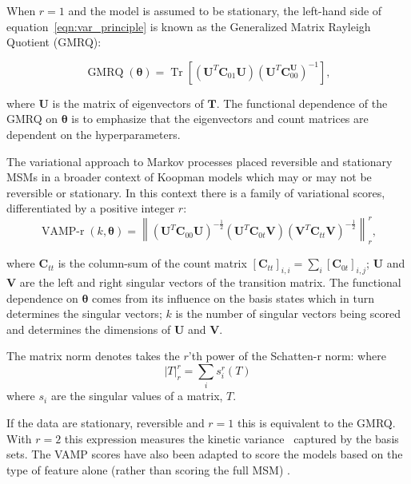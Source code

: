 \documentclass[journal=jacsat,manuscript=article]{achemso}
\begin{document}
When $r=1$ and the model is assumed to be stationary\cite{mcgibbonVariationalCrossvalidationSlow2015}, the left-hand side of equation~\ref{eqn:var_principle} is known as the Generalized Matrix Rayleigh Quotient (GMRQ):

\begin{equation}
    \operatorname{GMRQ}(\bm{\theta}) = \operatorname{Tr}\left[(\mathbf{U}^{T}\mathbf{C}_{01}\mathbf{U})(\mathbf{U}^{T}\mathbf{C}_{00}^\mathbf{U})^{-1}\right], \label{eqn:gmrq_def}
\end{equation}

where $\mathbf{U}$ is the matrix of eigenvectors of $\mathbf{T}$. The functional dependence of the GMRQ on $\bm{\theta}$ is to emphasize that the eigenvectors and count matrices are dependent on the hyperparameters. 

The variational approach to Markov processes placed reversible and stationary MSMs in a broader context of Koopman models which may or may not be reversible or stationary.  In this context there is a family of variational scores, differentiated by a positive integer $r$: 
\begin{equation}
     \operatorname{VAMP-r}(k, \bm{\theta}) = \left \| (\mathbf{U}^{T}\mathbf{C}_{00}\mathbf{U})^{-\frac{1}{2}}(\mathbf{U}^{T}\mathbf{C}_{0t}\mathbf{V})(\mathbf{V}^{T}\mathbf{C}_{tt}\mathbf{V})^{-\frac{1}{2}} \right \|_{r}^{r}, \label{eqn:vamp_def}
\end{equation}

where $\mathbf{C}_{tt}$ is the column-sum of the count matrix $[\mathbf{C}_{tt}]_{i, i} = \sum_i [\mathbf{C}_{0t}]_{i, j}$; $\mathbf{U}$ and $\mathbf{V}$ are the left and right singular vectors of the transition matrix. The functional dependence on $\bm{\theta}$ comes from its influence on the basis states which in turn determines the singular vectors; $k$ is the number of singular vectors being scored and determines the dimensions of $\mathbf{U}$ and $\mathbf{V}$.  

The matrix norm denotes takes the $r$'th power of the Schatten-r norm: 
where
\begin{equation}
    \left | T \right |_{r}^{r} = \sum_{i}s_i^r(T)
\end{equation}
where $s_i$ are the singular values of a matrix, $T$. 

If the data are stationary, reversible and $r=1$ this is equivalent to the GMRQ. With $r=2$ this expression measures the kinetic variance~\cite{noeKineticDistanceKinetic2015} captured by the basis sets. The VAMP scores have also been adapted to score the models based on the type of feature alone (rather than scoring the full MSM) \cite{scherer_variational_2019}. 
\end{document}
